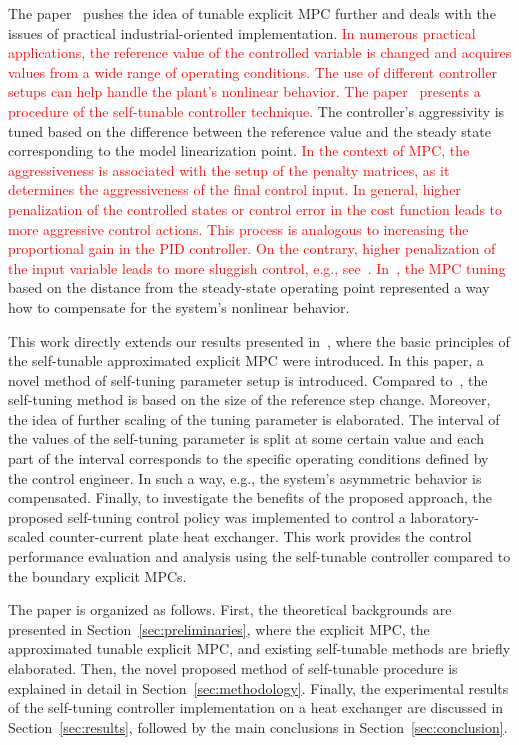 \documentclass[preprint,12pt]{elsarticle}
\newcommand{\change}[1]{\textcolor{red}{#1}}
\begin{document}
	The paper~\cite{self_tunable} pushes the idea of tunable explicit MPC further and deals with the issues of practical industrial-oriented implementation. \change{In numerous practical applications, the reference value of the controlled variable is changed and acquires values from a wide range of operating conditions. The use of different controller setups can help handle the plant's nonlinear behavior. The paper~\cite{self_tunable} presents a procedure of the self-tunable controller technique.} The controller's aggressivity is tuned based on the difference between the reference value and the steady state corresponding to the model linearization point. \change{In the context of MPC, the aggressiveness is associated with the setup of the penalty matrices, as it determines the aggressiveness of the final control input. In general, higher penalization of the controlled states or control error in the cost function leads to more aggressive control actions. This process is analogous to increasing the proportional gain in the PID controller. On the contrary, higher penalization of the input variable leads to more sluggish control, e.g., see~\cite{Maciejowski_MPC}. In~\cite{self_tunable}, the MPC tuning} based on the distance from the steady-state operating point represented a way how to compensate for the system's nonlinear behavior.  
	
	This work directly extends our results presented in~\cite{self_tunable}, where the basic principles of the self-tunable approximated explicit MPC were introduced. In this paper, a novel method of self-tuning parameter setup is introduced. Compared to~\cite{self_tunable}, the self-tuning method is based on the size of the reference step change. Moreover, the idea of further scaling of the tuning parameter is elaborated. The interval of the values of the self-tuning parameter is split at some certain value and each part of the interval corresponds to the specific operating conditions defined by the control engineer. In such a way, e.g., the system's asymmetric behavior is compensated. Finally, to investigate the benefits of the proposed approach, the proposed self-tuning control policy was implemented to control a laboratory-scaled counter-current plate heat exchanger. This work provides the control performance evaluation and analysis using the self-tunable controller compared to the boundary explicit MPCs.
	
	The paper is organized as follows. First, the theoretical backgrounds are presented in Section~\ref{sec:preliminaries}, where the explicit MPC, the approximated tunable explicit MPC, and existing self-tunable methods are briefly elaborated. Then, the novel proposed method of self-tunable procedure is explained in detail in Section~\ref{sec:methodology}. Finally, the experimental results of the self-tuning controller implementation on a heat exchanger are discussed in Section~\ref{sec:results}, followed by the main conclusions in Section~\ref{sec:conclusion}.
	
\end{document}
